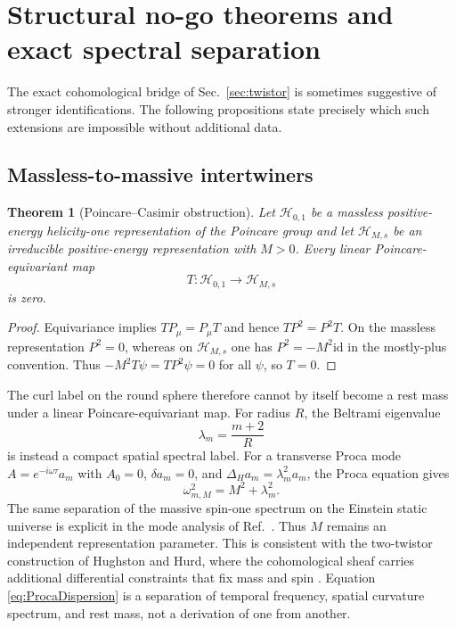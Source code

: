 \documentclass[aps,prd,reprint,nofootinbib,superscriptaddress]{revtex4-2}
\newtheorem{theorem}{Theorem}[section]
\theoremstyle{definition}
\theoremstyle{remark}
\newcommand{\id}{\mathrm{id}}
\begin{document}
\section{Structural no-go theorems and exact spectral separation}
\label{sec:nogo}

The exact cohomological bridge of Sec.~\ref{sec:twistor} is sometimes suggestive of stronger identifications.  The following propositions state precisely which such extensions are impossible without additional data.

\subsection{Massless-to-massive intertwiners}

\begin{theorem}[Poincare--Casimir obstruction]
\label{thm:CasimirNoGo}
Let $\mathscr H_{0,1}$ be a massless positive-energy helicity-one representation of the Poincare group and let $\mathscr H_{M,s}$ be an irreducible positive-energy representation with $M>0$.  Every linear Poincare-equivariant map
\begin{equation}
 T:\mathscr H_{0,1}\longrightarrow\mathscr H_{M,s}
\end{equation}
is zero.
\end{theorem}

\begin{proof}
Equivariance implies $TP_\mu=P_\mu T$ and hence $TP^2=P^2T$.  On the massless representation $P^2=0$, whereas on $\mathscr H_{M,s}$ one has $P^2=-M^2\id$ in the mostly-plus convention.  Thus $-M^2T\psi=TP^2\psi=0$ for all $\psi$, so $T=0$.
\end{proof}

The curl label on the round sphere therefore cannot by itself become a rest mass under a linear Poincare-equivariant map.  For radius $R$, the Beltrami eigenvalue
\begin{equation}
 \lambda_m=\frac{m+2}{R}
\end{equation}
is instead a compact spatial spectral label.  For a transverse Proca mode $A=e^{-i\omega\tau}a_m$ with $A_0=0$, $\delta a_m=0$, and $\Delta_Ha_m=\lambda_m^2a_m$, the Proca equation gives
\begin{equation}
 \omega_{m,M}^2=M^2+\lambda_m^2.
 \label{eq:ProcaDispersion}
\end{equation}
The same separation of the massive spin-one spectrum on the Einstein static universe is explicit in the mode analysis of Ref.~\cite{FewsterPfenning2003}.  Thus $M$ remains an independent representation parameter.  This is consistent with the two-twistor construction of Hughston and Hurd, where the cohomological sheaf carries additional differential constraints that fix mass and spin \cite{HughstonHurd1981}.  Equation \eqref{eq:ProcaDispersion} is a separation of temporal frequency, spatial curvature spectrum, and rest mass, not a derivation of one from another.
\end{document}
